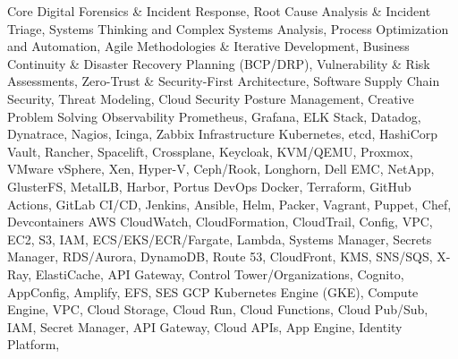 \begin{cvskills}
    \cvskill
        { Core }
        {
          Digital Forensics \& Incident Response,
          Root Cause Analysis \& Incident Triage,
          Systems Thinking and Complex Systems Analysis,
          Process Optimization and Automation,
          Agile Methodologies \& Iterative Development,
          Business Continuity \& Disaster Recovery Planning (BCP/DRP),
          Vulnerability \& Risk Assessments,
          Zero-Trust \& Security-First Architecture,
          Software Supply Chain Security,
          Threat Modeling,
          Cloud Security Posture Management,
          Creative Problem Solving
        }
    \cvskill
        { Observability }
        {
          Prometheus,
          Grafana,
          ELK Stack,
          Datadog,
          Dynatrace,
          Nagios,
          Icinga,
          Zabbix
        }
    \cvskill
        { Infrastructure }
        {
          Kubernetes,
          etcd,
          HashiCorp Vault,
          Rancher,
          Spacelift,
          Crossplane,
          Keycloak,
          KVM/QEMU,
          Proxmox,
          VMware vSphere,
          Xen,
          Hyper-V,
          Ceph/Rook,
          Longhorn,
          Dell EMC,
          NetApp,
          GlusterFS,
          MetalLB,
          Harbor,
          Portus
        }
    \cvskill
        { DevOps }
        {
          Docker,
          Terraform,
          GitHub Actions,
          GitLab CI/CD,
          Jenkins,
          Ansible,
          Helm,
          Packer,
          Vagrant,
          Puppet,
          Chef,
          Devcontainers
        }
    \cvskill
        { AWS }
        {
          CloudWatch,
          CloudFormation,
          CloudTrail,
          Config,
          VPC,
          EC2,
          S3,
          IAM,
          ECS/EKS/ECR/Fargate,
          Lambda,
          Systems Manager,
          Secrets Manager,
          RDS/Aurora,
          DynamoDB,
          Route 53,
          CloudFront,
          KMS,
          SNS/SQS,
          X-Ray,
          ElastiCache,
          API Gateway,
          Control Tower/Organizations,
          Cognito,
          AppConfig,
          Amplify,
          EFS,
          SES
        }
    \cvskill
        { GCP }
        {
          Kubernetes Engine (GKE),
          Compute Engine,
          VPC,
          Cloud Storage,
          Cloud Run,
          Cloud Functions,
          Cloud Pub/Sub,
          IAM,
          Secret Manager,
          API Gateway,
          Cloud APIs,
          App Engine,
          Identity Platform,
}
\end{cvskills}
